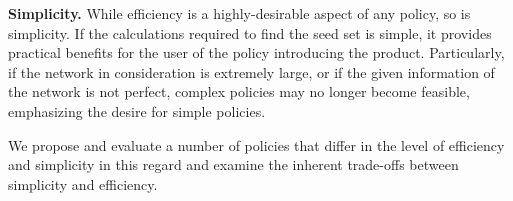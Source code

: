 \noindent \textbf{Simplicity.} While efficiency is a highly-desirable aspect of any policy, so is simplicity. If the calculations required to find the seed set is simple, it provides practical benefits for the user of the policy introducing the product. Particularly, if the network in consideration is extremely large, or if the given information of the network is not perfect, complex policies may no longer become feasible, emphasizing the desire for simple policies. 

We propose and evaluate a number of policies that differ in the level of efficiency and simplicity in this regard and examine the inherent trade-offs between simplicity and efficiency.
